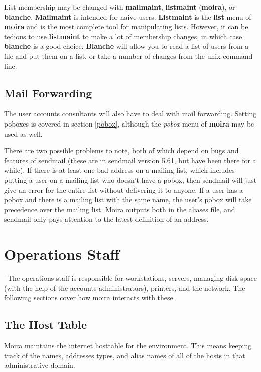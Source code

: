 \documentclass{book}
\begin{document}
List membership may be changed with {\bf mailmaint}, {\bf listmaint}
({\bf moira}), or {\bf blanche}.  {\bf Mailmaint} is intended for naive
users.  {\bf Listmaint} is the {\bf list} menu of {\bf moira} and is the
most complete tool for manipulating lists.  However, it can be tedious
to use {\bf listmaint} to make a lot of membership changes, in which
case {\bf blanche} is a good choice.  {\bf Blanche} will allow you to read
a list of users from a file and put them on a list, or take a number
of changes from the {\sc unix} command line.

\section{Mail Forwarding}

The user accounts consultants will also have to deal with mail
forwarding.  Setting poboxes is covered in section \ref{pobox},
although the {\em pobox} menu of {\bf moira} may be used as well.

There are two possible problems to note, both of which depend on bugs
and features of sendmail (these are in sendmail version 5.61, but have
been there for a while).  If there is at least one bad address on a
mailing list, which includes putting a user on a mailing list who
doesn't have a pobox, then sendmail will just give an error for the
entire list without delivering it to anyone.   If a user
has a pobox and there is a mailing list with the same name, the user's
pobox will take precedence over the mailing list.  Moira outputs both
in the aliases file, and sendmail only pays attention to the latest
definition of an address.

\chapter{Operations Staff}

\athena\ The operations staff is responsible for workstations,
servers, managing disk space (with the help of the accounts
administrators), printers, and the network.  The following sections
cover how moira interacts with these.

\section{The Host Table}

Moira maintains the internet hosttable for the environment.  This
means keeping track of the names, addresses types, and alias names of
all of the hosts in that administrative domain.
\end{document}

